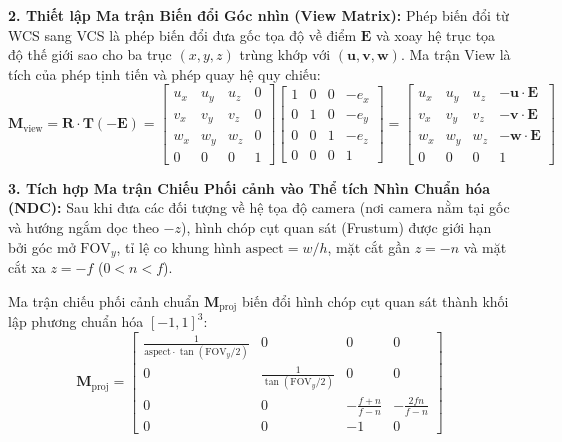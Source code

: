 \textbf{2. Thiết lập Ma trận Biến đổi Góc nhìn (View Matrix):}
Phép biến đổi từ WCS sang VCS là phép biến đổi đưa gốc tọa độ về điểm $\mathbf{E}$ và xoay hệ trục tọa độ thế giới sao cho ba trục $(x, y, z)$ trùng khớp với $(\mathbf{u}, \mathbf{v}, \mathbf{w})$. Ma trận View là tích của phép tịnh tiến và phép quay hệ quy chiếu:
\begin{equation}
\mathbf{M}_{\text{view}} = \mathbf{R} \cdot \mathbf{T}(-\mathbf{E}) = \begin{bmatrix}
u_x & u_y & u_z & 0 \\
v_x & v_y & v_z & 0 \\
w_x & w_y & w_z & 0 \\
0 & 0 & 0 & 1
\end{bmatrix} \begin{bmatrix}
1 & 0 & 0 & -e_x \\
0 & 1 & 0 & -e_y \\
0 & 0 & 1 & -e_z \\
0 & 0 & 0 & 1
\end{bmatrix} = \begin{bmatrix}
u_x & u_y & u_z & -\mathbf{u} \cdot \mathbf{E} \\
v_x & v_y & v_z & -\mathbf{v} \cdot \mathbf{E} \\
w_x & w_y & w_z & -\mathbf{w} \cdot \mathbf{E} \\
0 & 0 & 0 & 1
\end{bmatrix}
\end{equation}

\textbf{3. Tích hợp Ma trận Chiếu Phối cảnh vào Thể tích Nhìn Chuẩn hóa (NDC):}
Sau khi đưa các đối tượng về hệ tọa độ camera (nơi camera nằm tại gốc và hướng ngắm dọc theo $-z$), hình chóp cụt quan sát (Frustum) được giới hạn bởi góc mở $\text{FOV}_y$, tỉ lệ co khung hình $\text{aspect} = w/h$, mặt cắt gần $z = -n$ và mặt cắt xa $z = -f$ ($0 < n < f$).

Ma trận chiếu phối cảnh chuẩn $\mathbf{M}_{\text{proj}}$ biến đổi hình chóp cụt quan sát thành khối lập phương chuẩn hóa $[-1, 1]^3$:
\begin{equation}
\label{eq:opengl_perspective_matrix}
\mathbf{M}_{\text{proj}} = \begin{bmatrix}
\frac{1}{\text{aspect} \cdot \tan(\text{FOV}_y/2)} & 0 & 0 & 0 \\
0 & \frac{1}{\tan(\text{FOV}_y/2)} & 0 & 0 \\
0 & 0 & -\frac{f + n}{f - n} & -\frac{2fn}{f - n} \\
0 & 0 & -1 & 0
\end{bmatrix}
\end{equation}

